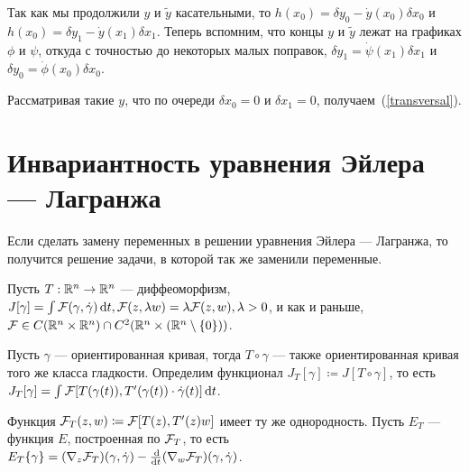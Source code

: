 \documentclass[a4paper]{article}
\begin{document}
    Так как мы продолжили $y$ и $\tilde{y}$ касательными, то $h(x_0) = \delta y_0 - \dot{y}(x_0)\delta x_0$ и $h(x_0) = \delta y_1 - \dot{y}(x_1)\delta x_1$.
    Теперь вспомним, что концы $y$ и $\tilde{y}$ лежат на графиках $\phi$ и $\psi$, откуда с точностью до некоторых малых поправок, $\delta y_1 = \dot{\psi}(x_1)\delta x_1$ и $\delta y_0 = \dot{\phi}(x_0)\delta x_0$.
    
    Рассматривая такие $y$, что по очереди $\delta x_0 = 0$ и $\delta x_1 = 0$, получаем~(\ref{transversal}).
    \section{Инвариантность уравнения Эйлера --- Лагранжа}
    Если сделать замену переменных в решении уравнения Эйлера --- Лагранжа, то получится решение задачи, в которой так же заменили переменные.

    Пусть $T: \mathbb{R}^n \rightarrow \mathbb{R}^n$ --- диффеоморфизм, $J[\gamma] = \int\mathcal{F}(\gamma, \dot{\gamma})\operatorname{d}\! t, \mathcal{F}(z, \lambda w) = \lambda\mathcal{F}(z, w), \lambda > 0$, и как и раньше, $\mathcal{F} \in C(\mathbb{R}^n \times \mathbb{R}^n) \cap C^2(\mathbb{R}^n \times (\mathbb{R}^n \setminus \{0\}))$.

    Пусть $\gamma$ --- ориентированная кривая, тогда $T \circ \gamma$ --- также ориентированная кривая того же класса гладкости.
    Определим функционал $J_T[\gamma] \coloneqq J[T \circ \gamma]$, то есть $J_T[\gamma] = \int \mathcal{F}[T(\gamma(t)), T'(\gamma(t)) \cdot \dot{\gamma}(t)]\operatorname{d}\! t$.

    Функция $\mathcal{F}_T(z, w) \coloneqq \mathcal{F}[T(z), T'(z)w]$ имеет ту же однородность.
    Пусть $E_T$ --- функция $E$, построенная по $\mathcal{F}_T$, то есть $E_T\{\gamma\} = (\nabla_{z} \mathcal{F}_T)(\gamma, \dot{\gamma}) - \frac{\operatorname{d}\!}{\operatorname{d}\! t}(\nabla_w \mathcal{F}_T)(\gamma, \dot{\gamma})$.
\end{document}
